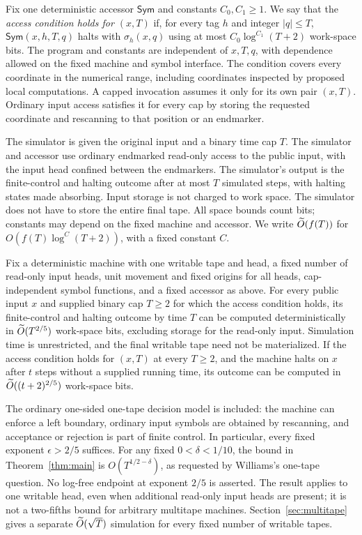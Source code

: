 Fix one deterministic accessor \(\mathsf{Sym}\) and constants
\(C_0,C_1\ge1\). We say that the \emph{access condition holds for \((x,T)\)}
if, for every tag \(h\) and integer \(|q|\le T\),
\(\mathsf{Sym}(x,h,T,q)\) halts with \(\sigma_h(x,q)\) using at most
\(C_0\log^{C_1}(T+2)\) work-space bits. The program and constants are
independent of \(x,T,q\), with dependence allowed on the fixed machine
and symbol interface. The condition covers every coordinate in the
numerical range, including coordinates inspected by proposed local
computations. A capped invocation assumes it only for its own pair
\((x,T)\). Ordinary input access satisfies it for every cap by storing
the requested coordinate and rescanning to that position or an endmarker.

The simulator is given the original input and a binary time cap \(T\).
The simulator and accessor use ordinary endmarked read-only access to
the public input, with the input head confined between the endmarkers.
The simulator's output is the finite-control and halting
outcome after at most \(T\) simulated steps, with halting states made
absorbing. Input storage is not charged to work space. The simulator
does not have to store the entire final tape.
All space bounds count bits; constants may depend on the fixed machine
and accessor.
We write \(\widetilde O(f(T))\) for
\(O(f(T)\log^C(T+2))\), with a fixed constant \(C\).

\begin{theorem}
\label{thm:main}
Fix a deterministic machine with one writable tape and head, a fixed
number of read-only input heads, unit movement and fixed origins for
all heads, cap-independent symbol functions, and a fixed accessor as above.
For every public input \(x\) and supplied binary cap \(T\ge2\) for which
the access condition
holds, its finite-control and halting outcome by time \(T\) can be
computed deterministically in \(\widetilde O(T^{2/5})\) work-space bits,
excluding storage for the read-only input. Simulation time is
unrestricted, and the final writable tape need not be materialized.
If the access condition holds for \((x,T)\) at every \(T\ge2\), and
the machine halts on \(x\) after \(t\) steps without a supplied running
time, its outcome can be computed in
\(\widetilde O((t+2)^{2/5})\) work-space bits.
\end{theorem}

The ordinary one-sided one-tape decision model is included: the machine
can enforce a left boundary, ordinary input symbols are obtained by
rescanning, and acceptance or rejection is part of finite control.
In particular, every fixed exponent \(\epsilon>2/5\) suffices.
For any fixed \(0<\delta<1/10\), the bound in
Theorem~\ref{thm:main} is \(O(T^{1/2-\delta})\), as requested by
Williams's one-tape question. No log-free endpoint at exponent \(2/5\)
is asserted. The result applies to one writable head, even when
additional read-only input heads are present; it is not a two-fifths
bound for arbitrary multitape machines.
Section~\ref{sec:multitape} gives a separate
\(\widetilde O(\sqrt T)\) simulation for every fixed number of writable tapes.

